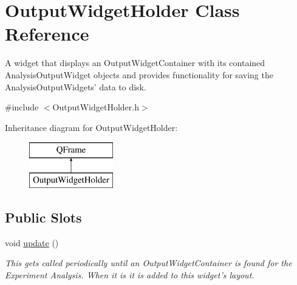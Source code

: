 \hypertarget{class_output_widget_holder}{\section{Output\-Widget\-Holder Class Reference}
\label{class_output_widget_holder}
}


A widget that displays an Output\-Widget\-Container with its contained Analysis\-Output\-Widget objects and provides functionality for saving the Analysis\-Output\-Widgets' data to disk.  




{\ttfamily \#include $<$Output\-Widget\-Holder.\-h$>$}

Inheritance diagram for Output\-Widget\-Holder\-:\begin{figure}[H]
\begin{center}
\leavevmode
\includegraphics[height=2.000000cm]{class_output_widget_holder}
\end{center}
\end{figure}
\subsection*{Public Slots}
\begin{DoxyCompactItemize}
\item 
void \hyperlink{class_output_widget_holder_a36d71a2afb9fc5008191e3273496585a}{update} ()
\begin{DoxyCompactList}\small\item\em This gets called periodically until an Output\-Widget\-Container is found for the Experiment Analysis. When it is it is added to this widget's layout. \end{DoxyCompactList}\end{DoxyCompactItemize}
